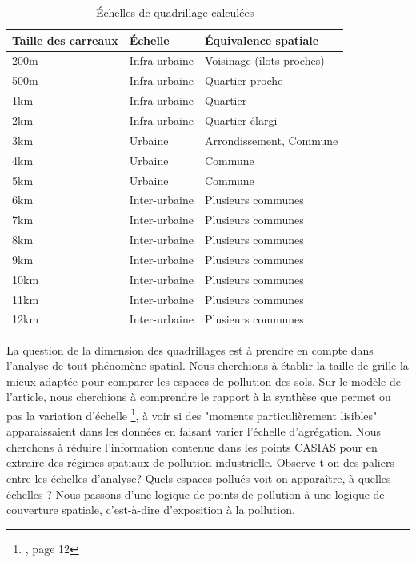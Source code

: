 \documentclass[a4paper,twoside,12pt]{book}
\begin{document}
\begin{table}[h]
\centering
\small
\caption{Échelles de quadrillage calculées}
\label{fig:14_grilles}
\begin{tabular}{>{\raggedright}p{3.5cm}p{3.5cm}p{5cm}}
    \toprule
    Taille des carreaux & Échelle & Équivalence spatiale \\
    \midrule
    200m & Infra-urbaine & Voisinage (îlots proches) \\
    500m & Infra-urbaine & Quartier proche \\
    1km & Infra-urbaine & Quartier \\
    2km & Infra-urbaine & Quartier élargi \\
    3km & Urbaine & Arrondissement, Commune  \\
    4km & Urbaine & Commune \\
    5km & Urbaine & Commune \\ 
    6km & Inter-urbaine & Plusieurs communes \\
    7km & Inter-urbaine & Plusieurs communes\\
    8km & Inter-urbaine & Plusieurs communes\\
    9km & Inter-urbaine & Plusieurs communes\\
    10km & Inter-urbaine & Plusieurs communes\\
    11km & Inter-urbaine & Plusieurs communes\\
    12km & Inter-urbaine & Plusieurs communes\\
    \bottomrule
\end{tabular}
\end{table}

La question de la dimension des quadrillages est à prendre en compte dans l’analyse de tout phénomène spatial. Nous cherchions à établir la taille de grille la mieux adaptée pour comparer les espaces de pollution des sols. Sur le modèle de l'article, nous cherchions à comprendre le \og{} rapport à la synthèse que permet ou pas la variation d'échelle \fg{} \footnote{\cite{verdier_question_2018}, page 12}, à  voir si des "moments particulièrement lisibles" apparaissaient dans les données en faisant varier l'échelle d'agrégation.  Nous cherchons à réduire l'information contenue dans les points CASIAS pour en extraire des régimes spatiaux de pollution industrielle. Observe-t-on des paliers entre les échelles d'analyse? Quels espaces pollués voit-on apparaître, à quelles échelles ?  Nous passons d'une logique de points de pollution à une logique de couverture spatiale, c'est-à-dire d'exposition à la pollution. 
\end{document}
